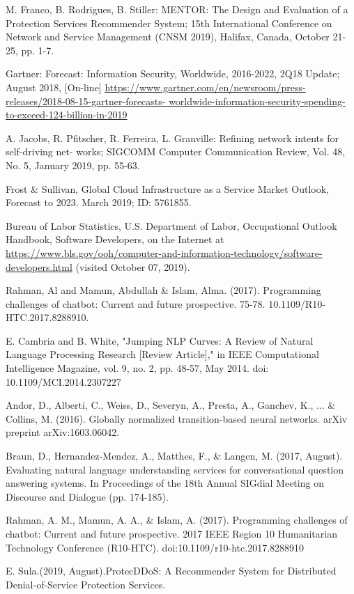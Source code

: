 \begin{thebibliography}{99}

 M. Franco, B. Rodrigues, B. Stiller: MENTOR: The Design and Evaluation of a Protection Services Recommender System; 15th International Conference on Network and Service Management (CNSM 2019), Halifax, Canada, October 21-25, pp. 1-7.

 Gartner: Forecast: Information Security, Worldwide, 2016-2022, 2Q18 Update; August 2018, [On-line] \url{https://www.gartner.com/en/newsroom/press-releases/2018-08-15-gartner-forecasts- worldwide-information-security-spending-to-exceed-124-billion-in-2019}


 A. Jacobs, R. Pfitscher, R. Ferreira, L. Granville: Refining network intents for self-driving net- works; SIGCOMM Computer Communication Review, Vol. 48, No. 5, January 2019, pp. 55-63.

 Frost \& Sullivan, Global Cloud Infrastructure as a Service Market Outlook, Forecast to 2023. March 2019; ID: 5761855.

Bureau of Labor Statistics, U.S. Department of Labor, Occupational Outlook Handbook, Software Developers, 
on the Internet at \url{https://www.bls.gov/ooh/computer-and-information-technology/software-developers.html} (visited October 07, 2019).

Rahman, Al and Mamun, Abdullah \& Islam, Alma. (2017). Programming challenges of chatbot: Current and future prospective. 75-78. 10.1109/R10-HTC.2017.8288910. 

E. Cambria and B. White, "Jumping NLP Curves: A Review of Natural Language Processing Research [Review Article]," in IEEE Computational Intelligence Magazine, vol. 9, no. 2, pp. 48-57, May 2014.
doi: 10.1109/MCI.2014.2307227

 Andor, D., Alberti, C., Weiss, D., Severyn, A., Presta, A., Ganchev, K., ... \& Collins, M. (2016). Globally normalized transition-based neural networks. arXiv preprint arXiv:1603.06042.

 Braun, D., Hernandez-Mendez, A., Matthes, F., \& Langen, M. (2017, August). Evaluating natural language understanding services for conversational question answering systems. In Proceedings of the 18th Annual SIGdial Meeting on Discourse and Dialogue (pp. 174-185).

Rahman, A. M., Mamun, A. A., \& Islam, A. (2017). Programming challenges of chatbot: Current and future prospective. 2017 IEEE Region 10 Humanitarian Technology Conference (R10-HTC). doi:10.1109/r10-htc.2017.8288910 

 E. Sula.(2019, August).ProtecDDoS: A Recommender System for Distributed Denial-of-Service Protection Services. 

\end{thebibliography}

